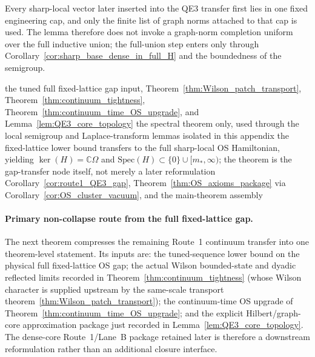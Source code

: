 \begin{remark}
Every sharp-local vector later inserted into the QE3 transfer first lies in one fixed engineering cap, and only the finite list of graph norms attached to that cap is used. The lemma therefore does not invoke a graph-norm completion uniform over the full inductive union; the full-union step enters only through Corollary~\ref{cor:sharp_base_dense_in_full_H} and the boundedness of the semigroup.
\end{remark}

\dependencyledger
  {the tuned full fixed-lattice gap input, Theorem~\ref{thm:Wilson_patch_transport}, Theorem~\ref{thm:continuum_tightness}, Theorem~\ref{thm:continuum_time_OS_upgrade}, and Lemma~\ref{lem:QE3_core_topology}}
  {the spectral theorem only, used through the local semigroup and Laplace-transform lemmas isolated in this appendix}
  {the fixed-lattice lower bound transfers to the full sharp-local OS Hamiltonian, yielding $\ker(H)=\mathbb C\Omega$ and $\mathrm{Spec}(H)\subset\{0\}\cup[m_*,\infty)$; the theorem is the gap-transfer node itself, not merely a later reformulation}
  {Corollary~\ref{cor:route1_QE3_gap}, Theorem~\ref{thm:OS_axioms_package} via Corollary~\ref{cor:OS_cluster_vacuum}, and the main-theorem assembly}

\paragraph{Primary non-collapse route from the full fixed-lattice gap.}
The next theorem compresses the remaining Route~1 continuum transfer into one theorem-level statement.
Its inputs are: the tuned-sequence lower bound on the physical full fixed-lattice OS gap; the actual Wilson bounded-state and dyadic reflected limits recorded in Theorem~\ref{thm:continuum_tightness} (whose Wilson character is supplied upstream by the same-scale transport theorem~\ref{thm:Wilson_patch_transport}); the continuum-time OS upgrade of Theorem~\ref{thm:continuum_time_OS_upgrade}; and the explicit Hilbert/graph-core approximation package just recorded in Lemma~\ref{lem:QE3_core_topology}.
The dense-core Route~1/Lane~B package retained later is therefore a downstream reformulation rather than an additional closure interface.

